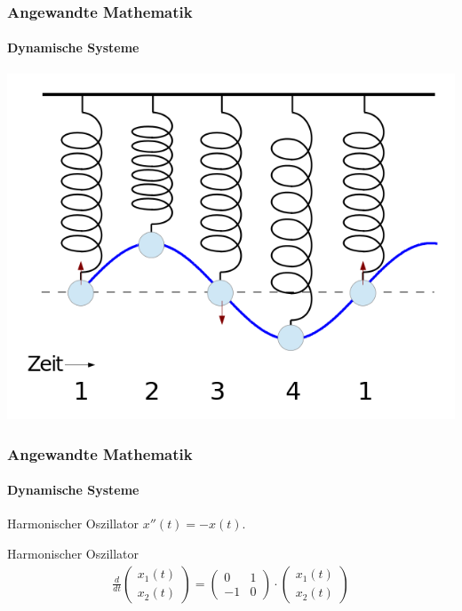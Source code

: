 \documentclass{beamer}
\begin{document}
\begin{frame}
    \frametitle{Angewandte Mathematik}
\framesubtitle{Dynamische Systeme }
\center
\includegraphics[scale=0.35]{images/federpendel}

 \end{frame}




\begin{frame}
    \frametitle{Angewandte Mathematik}
\framesubtitle{Dynamische Systeme }
\begin{block}{Harmonischer Oszillator}
$x''(t) = -x(t)$.
\end{block}
\begin{block}{Harmonischer Oszillator}
\begin{align*}
    \frac{d}{dt}\begin{pmatrix}
        x_1(t) \\ x_2(t)
    \end{pmatrix} = 
\begin{pmatrix}
    0 & 1  \\ -1 & 0
\end{pmatrix} \cdot
\begin{pmatrix} 
    x_1(t) \\ x_2(t)
\end{pmatrix} 
\end{align*}
\end{block}
 \end{frame}
\end{document}
